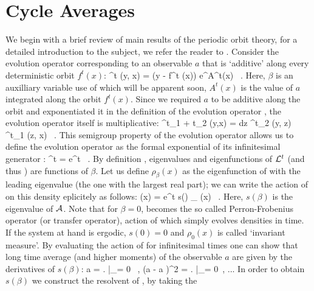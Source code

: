\section{Cycle Averages}
\label{s:DynAvers}
We begin with a brief review of main results of the periodic 
orbit theory, for a detailed introduction to the subject, we refer the reader to 
. Consider the evolution operator corresponding to an observable 
$a$ that is `additive' along every deterministic orbit $f^t(x)$:
\beq
	\Lop^t (y, x) = \delta (y - f^t (x)) e^{\beta A^t(x)} \, .
	\label{eq-EvOp}
\eeq
Here, $\beta$ is an auxilliary variable use of which will be apparent soon, 
$A^t (x)$ is the value of $a$ integrated along the orbit $f^t(x)$.
Since we required $a$ to be additive along the orbit and exponentiated
it in the definition of the evolution operator , the
evolution operator itself is multiplicative:
\beq
	\Lop^{t_1 + t_2} (y,x) = \int dz \Lop^{t_2} (y, z) \Lop^{t_1} (z, x) \, . 
	\label{eq-SemiGroup}
\eeq
This semigroup property of the evolution operator allows us to define
the evolution operator as the formal exponential of its infinitesimal
generator \Aop :
\beq
	\Lop^t = e^{\Aop t} \, . 
	\label{eq-EvOpExp}
\eeq 
By definition , eigenvalues and eigenfunctions of ${\cal L}^t$ (and 
thus \Aop ) are functions of $\beta$. Let us define $\rho_{\beta} (x)$ as the 
eigenfunction of  with the leading eigenvalue (the one with the 
largest real part); we can write the action of  on this density 
eplicitely as follows:
\beq
     (x) = e^{t s(\beta )} \rho_{\beta} (x) \, .
    \label{eq-EigenvalueRel}
\eeq
Here, $s(\beta)$ is the eigenvalue of ${\cal A}$. Note that for $\beta = 0$, 
 becomes the so called Perron-Frobenius operator (or transfer operator),
action of which simply evolves densities in time. If the system at hand is ergodic, 
$s(0) = 0$ and $\rho_0 (x)$ is called `invariant measure'. By evaluating the action 
of  for infinitesimal times one can show that long time average
(and higher moments) of the observable $a$ are given by the derivatives of $s(\beta)$:
\beq
    \langle a \rangle = \left.  \right|_{\beta = 0} \, , \quad
    \langle (a - \langle a \rangle )^2 \rangle = \left.  
                                                     \right|_{\beta = 0} \,, ...
    \label{eq-moments}                                                    
\eeq
In order to obtain $s(\beta)$ we construct the resolvent of \Aop , by taking the 
